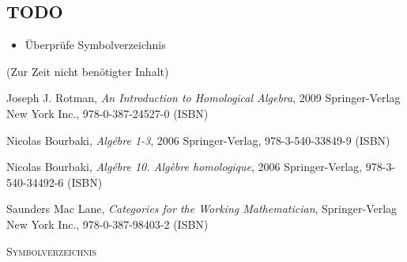 \documentclass[a4paper]{amsart}
\theoremstyle{definition}
\begin{document}
\begin{backup}
\section{TODO}
\begin{itemize}
     \item Überprüfe Symbolverzeichnis
\end{itemize}


\end{backup}

\begin{backup}
    (Zur Zeit nicht benötigter Inhalt)
\end{backup}

\begin{thebibliography}{9}
   	Joseph J. Rotman, \emph{An Introduction to Homological Algebra},
   	2009 Springer-Verlag New York Inc., 978-0-387-24527-0 (ISBN)

      Nicolas Bourbaki, \emph{Algébre 1-3},
      2006 Springer-Verlag, 978-3-540-33849-9 (ISBN)

      Nicolas Bourbaki, \emph{Algébre 10. Algèbre homologique},
      2006 Springer-Verlag, 978-3-540-34492-6 (ISBN)
      
      Saunders Mac Lane, \emph{Categories for the Working Mathematician},
      Springer-Verlag New York Inc., 978-0-387-98403-2 (ISBN)

\end{thebibliography}

\begin{large}
    \centerline{\textsc{Symbolverzeichnis}}
\end{large}
\bigskip
\end{document}
